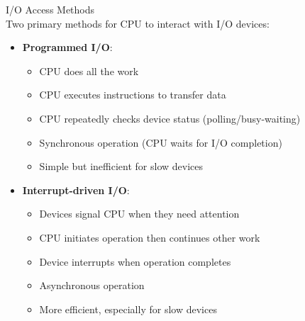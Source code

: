 \begin{definition}{I/O Access Methods}\\
    Two primary methods for CPU to interact with I/O devices:
    \begin{itemize}
        \item \textbf{Programmed I/O}:
            \begin{itemize}
                \item CPU does all the work
                \item CPU executes instructions to transfer data
                \item CPU repeatedly checks device status (polling/busy-waiting)
                \item Synchronous operation (CPU waits for I/O completion)
                \item Simple but inefficient for slow devices
            \end{itemize}
        \item \textbf{Interrupt-driven I/O}:
            \begin{itemize}
                \item Devices signal CPU when they need attention
                \item CPU initiates operation then continues other work
                \item Device interrupts when operation completes
                \item Asynchronous operation
                \item More efficient, especially for slow devices
            \end{itemize}
    \end{itemize}
\end{definition}

